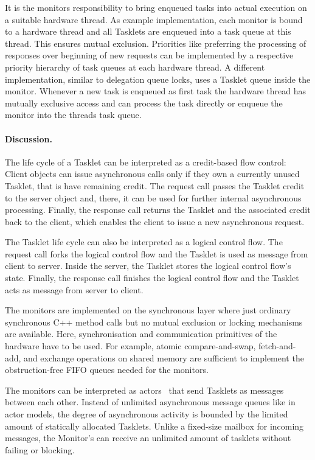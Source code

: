 It is the monitors responsibility to bring enqueued tasks into actual execution on a suitable hardware thread. As example implementation, each monitor is bound to a hardware thread and all Tasklets are enqueued into a task queue at this thread. This ensures mutual exclusion. Priorities like preferring the processing of responses over beginning of new requests can be implemented by a respective priority hierarchy of task queues at each hardware thread. A different implementation, similar to delegation queue locks, uses a Tasklet queue inside the monitor. Whenever a new task is enqueued as first task the hardware thread has mutually exclusive access and can process the task directly or enqueue the monitor into the threads task queue.

\paragraph{Discussion.}
The life cycle of a Tasklet can be interpreted as a credit-based flow control: Client objects can issue asynchronous calls only if they own a currently unused Tasklet, that is have remaining credit. The request call passes the Tasklet credit to the server object and, there, it can be used for further internal asynchronous processing. Finally, the response call returns the Tasklet and the associated credit back to the client, which enables the client to issue a new asynchronous request. 

The Tasklet life cycle can also be interpreted as a logical control flow. The request call forks the logical control flow and the Tasklet is used as message from client to server. Inside the server, the Tasklet stores the logical control flow's state. Finally, the response call finishes the logical control flow and the Tasklet acts as message from server to client.

The monitors are implemented on the synchronous layer where just ordinary synchronous C++ method calls but no mutual exclusion or locking mechanisms are available. Here, synchronisation and communication primitives of the hardware have to be used. For example, atomic compare-and-swap, fetch-and-add, and exchange operations on shared memory are sufficient to implement the obstruction-free FIFO queues needed for the monitors. 

\hspace{0px}
The monitors can be interpreted as actors~\cite{Hewitt:1973:UMA:1624775.1624804} that send Tasklets as messages between each other. Instead of unlimited asynchronous message queues like in actor models, the degree of asynchronous activity is bounded by the limited amount of statically allocated Tasklets. Unlike a fixed-size mailbox for incoming messages, the \mythos Monitor's can receive an unlimited amount of tasklets without failing or blocking.

